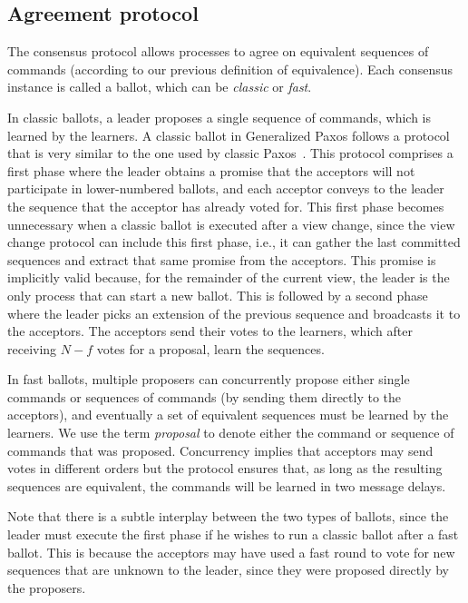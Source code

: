 \subsection{Agreement protocol} 

The consensus protocol allows processes to agree on equivalent sequences of commands (according to our previous definition of equivalence). Each consensus instance is called a ballot, which can be \textit{classic} or \textit{fast}. 

In classic ballots, a leader proposes a single sequence of commands, which is learned by the learners. 
A classic ballot in Generalized Paxos follows a protocol that is very similar to the one used by classic Paxos~\cite{Lam98}. This protocol comprises a first phase where the leader obtains a promise that the acceptors will not participate in lower-numbered ballots, and each acceptor conveys to the leader the sequence that the acceptor has already voted for. This first phase becomes unnecessary when a classic ballot is executed after a view change, since the view change protocol can include this first phase, i.e., it can gather the last committed sequences and extract that same promise from the acceptors. This promise is implicitly valid because, for the remainder of the current view, the leader is the only process that can start a new ballot. This is followed by a second phase where the leader picks an extension of the previous sequence and broadcasts it to the acceptors. The acceptors send their votes to the learners, which after receiving $N-f$ votes for a proposal, learn the sequences. 

In fast ballots, multiple proposers can concurrently propose either single commands or sequences of commands (by sending them directly to the acceptors), and eventually a set of equivalent sequences must be learned by the learners. We use the term \textit{proposal} to denote either the command or sequence of commands that was proposed.
Concurrency implies that acceptors may send votes in different orders but the protocol ensures that, as long as the resulting sequences are equivalent, the commands will be learned in two message delays. 

 Note that there is a subtle interplay between the two types of ballots, since the leader must execute the first phase if he wishes to run a classic ballot after a fast ballot. This is because the acceptors may have used a fast round to vote for new sequences that are unknown to the leader, since they were proposed directly by the proposers.

